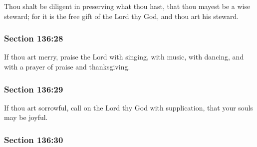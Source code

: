 		Thou shalt be diligent in preserving what thou hast, that thou mayest be a wise steward; for it is the free gift of the Lord thy God, and thou art his steward.


	\subsubsection{Section 136:28} %
		\label{DC136-28}

		If thou art merry, praise the Lord with singing, with music, with dancing, and with a prayer of praise and thanksgiving.


	\subsubsection{Section 136:29} %
		\label{DC136-29}

		If thou art sorrowful, call on the Lord thy God with supplication, that your souls may be joyful.


	\subsubsection{Section 136:30} %
		\label{DC136-30}

